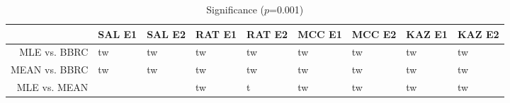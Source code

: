 \begin{table}[t]
\begin{center}
\begin{tabular}{rllllllll}
  \hline
 & SAL E1 & SAL E2 & RAT E1 & RAT E2 & MCC E1 & MCC E2 & KAZ E1 & KAZ E2 \\ 
  \hline
MLE vs. BBRC & tw & tw & tw & tw & tw & tw & tw & tw \\ 
  MEAN vs. BBRC & tw & tw & tw & tw & tw & tw & tw & tw \\ 
  MLE vs. MEAN &  &  & tw & t & tw & tw & tw & tw \\ 
   \hline
\end{tabular}
\caption{Significance ($p$=0.001)}
\label{t:sign}
\end{center}
\end{table}
